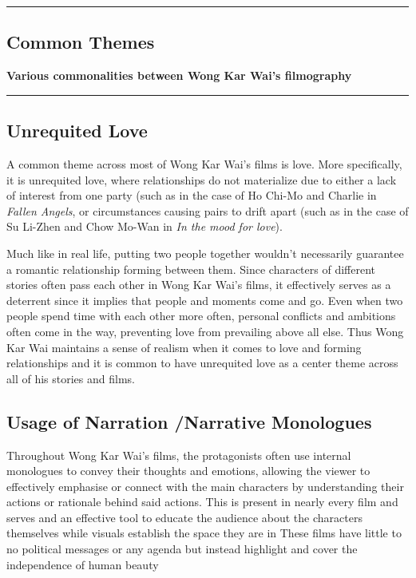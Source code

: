 {\color{gray}\hrule}
\begin{center}
\section{Common Themes}
\textbf{Various commonalities between Wong Kar Wai's filmography}
\end{center}
{\color{gray}\hrule}
\begin{multicols}{2}
\subsection{Unrequited Love}
A common theme across most of Wong Kar Wai's films is love. More specifically, it is unrequited love, where relationships do not materialize due to either a lack of interest from one party (such as in the case of Ho Chi-Mo and Charlie in \emph{Fallen Angels}, or circumstances causing pairs to drift apart (such as in the case of Su Li-Zhen and Chow Mo-Wan in \emph{In the mood for love}).

Much like in real life, putting two people together wouldn't necessarily guarantee a romantic relationship forming between them. Since characters of different stories often pass each other in Wong Kar Wai's films, it effectively serves as a deterrent since it implies that people and moments come and go. Even when two people spend time with each other more often, personal conflicts and ambitions often come in the way, preventing love from prevailing above all else. Thus Wong Kar Wai maintains a sense of realism when it comes to love and forming relationships and it is common to have unrequited love as a center theme across all of his stories and films.

\subsection{Usage of Narration /Narrative Monologues}
Throughout Wong Kar Wai's films, the protagonists often use internal monologues to convey their thoughts and emotions, allowing the viewer to effectively emphasise or connect with the main characters by understanding their actions or rationale behind said actions. This is present in nearly every film and serves and an effective tool to educate the audience about the characters themselves while visuals establish the space they are in These films have little to no political messages or any agenda but instead highlight and cover the independence of human beauty


\end{multicols}
